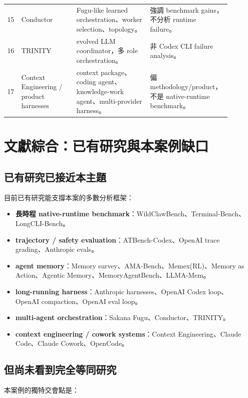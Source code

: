 \documentclass[UTF8,a4paper,11pt]{ctexart}
\begin{document}
\begin{longtable}{L{0.05\linewidth} L{0.24\linewidth} L{0.32\linewidth} L{0.30\linewidth}}
15 & Conductor \citep{conductor} & Fugu-like learned orchestration、worker selection、topology。 & 強調 benchmark gains，不分析 runtime failure。\\
16 & TRINITY \citep{trinity} & evolved LLM coordinator，多 role orchestration。 & 非 Codex CLI failure analysis。\\
17 & Context Engineering / product harnesses \citep{contextengineeringpaper,claudecode,claudecowork,opencode} & context package、coding agent、knowledge-work agent、multi-provider harness。 & 偏 methodology/product，不是 native-runtime benchmark。\\
\bottomrule
\end{longtable}
\normalsize

\section{文獻綜合：已有研究與本案例缺口}

\subsection{已有研究已接近本主題}

目前已有研究能支撐本案的多數分析框架：

\begin{itemize}
  \item \textbf{長時程 native-runtime benchmark}：WildClawBench、Terminal-Bench、LongCLI-Bench。
  \item \textbf{trajectory / safety evaluation}：ATBench-Codex、OpenAI trace grading、Anthropic evals。
  \item \textbf{agent memory}：Memory survey、AMA-Bench、Memex(RL)、Memory as Action、Agentic Memory、MemoryAgentBench、LLMA-Mem。
  \item \textbf{long-running harness}：Anthropic harnesses、OpenAI Codex loop、OpenAI compaction、OpenAI eval loop。
  \item \textbf{multi-agent orchestration}：Sakana Fugu、Conductor、TRINITY。
  \item \textbf{context engineering / cowork systems}：Context Engineering、Claude Code、Claude Cowork、OpenCode。
\end{itemize}

\subsection{但尚未看到完全等同研究}

本案例的獨特交會點是：
\end{document}
